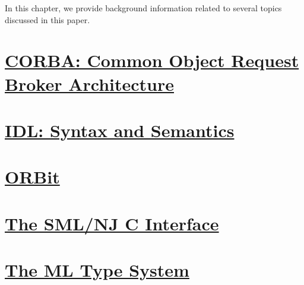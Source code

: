 
In this chapter, we provide background information related to several topics 
discussed in this paper. 

\section*{\underline{CORBA: Common Object Request Broker Architecture}}


\section*{\underline{IDL: Syntax and Semantics}}


\section*{\underline{ORBit}}


\section*{\underline{The SML/NJ C Interface}}


\section*{\underline{The ML Type System}}


